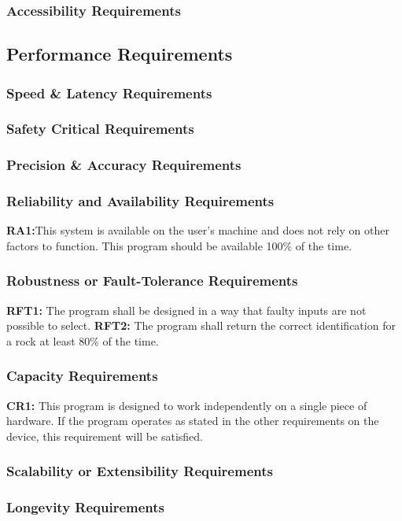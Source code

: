 \documentclass[titlepage]{article}
\begin{document}
\subsubsection{Accessibility Requirements}

\subsection{Performance Requirements}
\subsubsection{Speed \& Latency Requirements}
\subsubsection{Safety Critical Requirements}
\subsubsection{Precision \& Accuracy Requirements}
\subsubsection{Reliability and Availability Requirements}
\textbf{RA1:}This system is available on the user's machine and does not rely on other factors to function. This program should be available 100\% of the time.
\subsubsection{Robustness or Fault-Tolerance Requirements}
\textbf{RFT1:} The program shall be designed in a way that faulty inputs are not possible to select.
\textbf{RFT2:} The program shall return the correct identification for a rock at least 80\% of the time.
\subsubsection{Capacity Requirements}
\textbf{CR1:} This program is designed to work independently on a single piece of hardware. If the program operates as stated in the other requirements on the device, this requirement will be satisfied.
\subsubsection{Scalability or Extensibility Requirements}
\subsubsection{Longevity Requirements}
\end{document}
